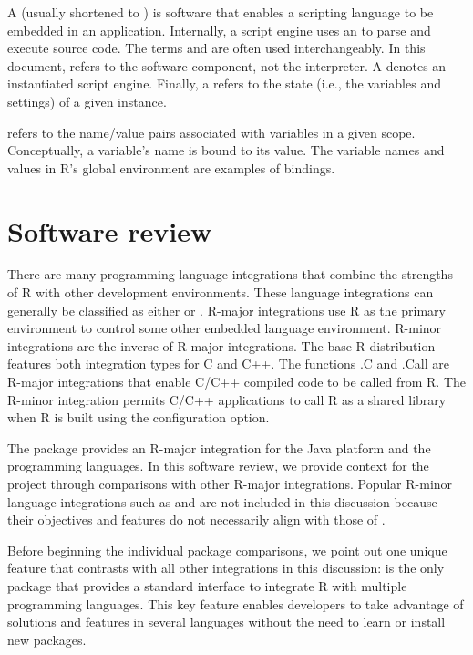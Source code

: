 A  (usually shortened to ) is software that enables a scripting language to be embedded in an application. Internally, a script engine uses an  to parse and execute source code. The terms  and  are often used interchangeably. In this document,  refers to the software component, not the interpreter. A  denotes an instantiated script engine. Finally, a  refers to the state (i.e., the variables and settings) of a given instance.

 refers to the name/value pairs associated with variables in a given scope. Conceptually, a variable's name is bound to its value. The variable names and values in R's global environment are examples of bindings.

\hypertarget{softwarereview}{\section{Software review}}

There are many programming language integrations that combine the strengths of R with other development environments. These language integrations can generally be classified as either  or . R-major integrations use R as the primary environment to control some other embedded language environment. R-minor integrations are the inverse of R-major integrations. The base R distribution features both integration types for C and C++. The functions .C and .Call are R-major integrations that enable C/C++ compiled code to be called from R. The R-minor integration permits C/C++ applications to call R as a shared library when R is built using the  configuration option.

The  package provides an R-major integration for the Java platform and the  programming languages. In this software review, we provide context for the  project through comparisons with other R-major integrations. Popular R-minor language integrations such as  \citep{rserve} and  \citep{opencpu} are not included in this discussion because their objectives and features do not necessarily align with those of .

Before beginning the individual package comparisons, we point out one unique feature that contrasts  with all other integrations in this discussion:  is the only package that provides a standard interface to integrate R with multiple programming languages. This key feature enables developers to take advantage of solutions and features in several languages without the need to learn or install new packages.

